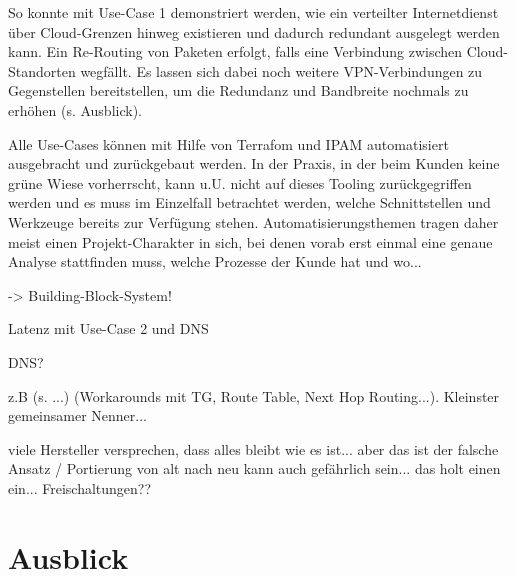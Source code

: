 So konnte mit Use-Case 1 demonstriert werden, wie ein verteilter Internetdienst über Cloud-Grenzen hinweg existieren und dadurch redundant ausgelegt werden kann. Ein Re-Routing von Paketen erfolgt, falls eine Verbindung zwischen Cloud-Standorten wegfällt. Es lassen sich dabei noch weitere VPN-Verbindungen zu Gegenstellen bereitstellen, um die Redundanz und Bandbreite nochmals zu erhöhen (s. Ausblick).

Alle Use-Cases können mit Hilfe von Terrafom und IPAM automatisiert ausgebracht und zurückgebaut werden. In der Praxis, in der beim Kunden keine \glqq grüne Wiese\grqq{} vorherrscht, kann u.U. nicht auf dieses Tooling zurückgegriffen werden und es muss im Einzelfall betrachtet werden, welche Schnittstellen und Werkzeuge bereits zur Verfügung stehen. Automatisierungsthemen tragen daher meist einen \glqq Projekt-Charakter\grqq{} in sich, bei denen vorab erst einmal eine genaue Analyse stattfinden muss, welche Prozesse der Kunde hat und wo...

-> Building-Block-System!

Latenz mit Use-Case 2 und DNS


DNS?





z.B (s. ...) (Workarounds mit TG, Route Table, Next Hop Routing...). Kleinster gemeinsamer Nenner...


viele Hersteller versprechen, dass alles bleibt wie es ist... aber das ist der falsche Ansatz / Portierung von alt nach neu kann auch gefährlich sein... das holt einen ein... Freischaltungen??

\section{Ausblick}

